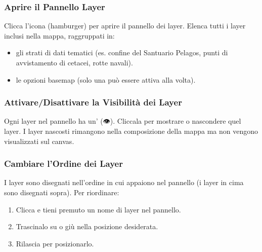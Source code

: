 \documentclass[letterpaper,10pt,english]{sphinxmanual}
\begin{document}
\subsubsection{Aprire il Pannello Layer}
\label{\detokenize{it/04_esplorare_mappe:aprire-il-pannello-layer}}
\sphinxAtStartPar
Clicca l’icona  (hamburger) per aprire il pannello dei layer. Elenca tutti i
layer inclusi nella mappa, raggruppati in:
\begin{itemize}
\item {} 
\sphinxAtStartPar
{} \textendash{} gli strati di dati tematici (es. confine del Santuario Pelagos, punti
di avvistamento di cetacei, rotte navali).

\item {} 
\sphinxAtStartPar
{} \textendash{} le opzioni basemap (solo una può essere attiva alla volta).

\end{itemize}


\subsubsection{Attivare/Disattivare la Visibilità dei Layer}
\label{\detokenize{it/04_esplorare_mappe:attivare-disattivare-la-visibilita-dei-layer}}
\sphinxAtStartPar
Ogni layer nel pannello ha un’ (👁). Cliccala per mostrare o nascondere
quel layer. I layer nascosti rimangono nella composizione della mappa ma non vengono
visualizzati sul canvas.


\subsubsection{Cambiare l’Ordine dei Layer}
\label{\detokenize{it/04_esplorare_mappe:cambiare-l-ordine-dei-layer}}
\sphinxAtStartPar
I layer sono disegnati nell’ordine in cui appaiono nel pannello (i layer in cima sono
disegnati sopra). Per riordinare:
\begin{enumerate}
%
\item {} 
\sphinxAtStartPar
Clicca e tieni premuto un nome di layer nel pannello.

\item {} 
\sphinxAtStartPar
Trascinalo su o giù nella posizione desiderata.

\item {} 
\sphinxAtStartPar
Rilascia per posizionarlo.

\end{enumerate}
\end{document}
